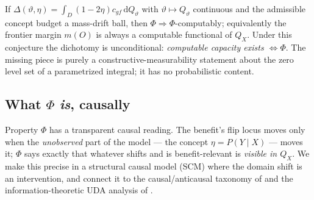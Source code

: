\begin{conjecture}
\label{conj:dich-compute}
If $\Delta(\vartheta,\eta)=\int_D(1-2\eta)c_{gf}\,\mathrm dQ_\vartheta$ with
$\vartheta\mapsto Q_\vartheta$ continuous and the admissible concept budget a
mass-drift ball, then $\Phi\Rightarrow\Phi$-computably; equivalently the frontier
margin $m(O)$ is always a computable functional of $Q_X$. Under this conjecture the
dichotomy is unconditional: \emph{computable capacity exists $\iff\Phi$}. The missing
piece is purely a constructive-measurability statement about the zero level set of a
parametrized integral; it has no probabilistic content.
\end{conjecture}

\subsection{What $\Phi$ \emph{is}, causally}\label{sec:dich-causal}
Property $\Phi$ has a transparent causal reading. The benefit's flip locus moves only
when the \emph{unobserved} part of the model --- the concept $\eta=P(Y\mid X)$ ---
moves it; $\Phi$ says exactly that whatever shifts and is benefit-relevant is
\emph{visible in $Q_X$}. We make this precise in a structural causal model (SCM) where
the domain shift is an intervention, and connect it to the causal/anticausal taxonomy
of \citet{scholkopf2012causal} and the information-theoretic UDA analysis of
\citet{wu2024causality}.

